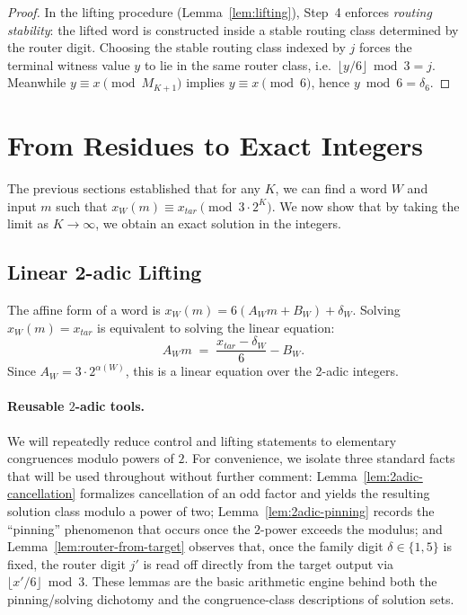 \documentclass[11pt,letterpaper]{amsart}
\def\mathrm#1{#1}%
\theoremstyle{definition}
\theoremstyle{plain}
\theoremstyle{plain}
\theoremstyle{remark}
\begin{document}
\begin{proof}
In the lifting procedure (Lemma~\ref{lem:lifting}), Step~4 enforces \emph{routing stability}:
the lifted word is constructed inside a stable routing class determined by the router digit.
Choosing the stable routing class indexed by $j$ forces the terminal witness value $y$
to lie in the same router class, i.e.\ $\lfloor y/6\rfloor \bmod 3=j$.
Meanwhile $y\equiv x\pmod{M_{K+1}}$ implies $y\equiv x\pmod 6$, hence $y\bmod 6=\delta_{6}$.
\end{proof}




\section{From Residues to Exact Integers}
\label{sec:exact-integers}

The previous sections established that for any $K$, we can find a word $W$ and input $m$ such that $x_W(m) \equiv x_{\mathrm{tar}} \pmod{3 \cdot 2^K}$. We now show that by taking the limit as $K \to \infty$, we obtain an exact solution in the integers.

\subsection{Linear 2-adic Lifting}
The affine form of a word is $x_W(m) = 6(A_W m + B_W) + \delta_W$. Solving $x_W(m) = x_{\mathrm{tar}}$ is equivalent to solving the linear equation:
\begin{equation}
\label{eq:exact-linear}
A_W m \;=\; \frac{x_{\mathrm{tar}} - \delta_W}{6} - B_W.
\end{equation}
Since $A_W = 3 \cdot 2^{\alpha(W)}$, this is a linear equation over the 2-adic integers.

\paragraph{Reusable $2$-adic tools.}
We will repeatedly reduce control and lifting statements to elementary congruences modulo powers of $2$.
For convenience, we isolate three standard facts that will be used throughout without further comment:
Lemma~\ref{lem:2adic-cancellation} formalizes cancellation of an odd factor and yields the resulting solution class modulo a power of two;
Lemma~\ref{lem:2adic-pinning} records the ``pinning'' phenomenon that occurs once the $2$-power exceeds the modulus;
and Lemma~\ref{lem:router-from-target} observes that, once the family digit $\delta\in\{1,5\}$ is fixed, the router digit $j'$
is read off directly from the target output via $\lfloor x'/6\rfloor\bmod 3$.
These lemmas are the basic arithmetic engine behind both the pinning/solving dichotomy and the congruence-class descriptions of solution sets.
\end{document}
